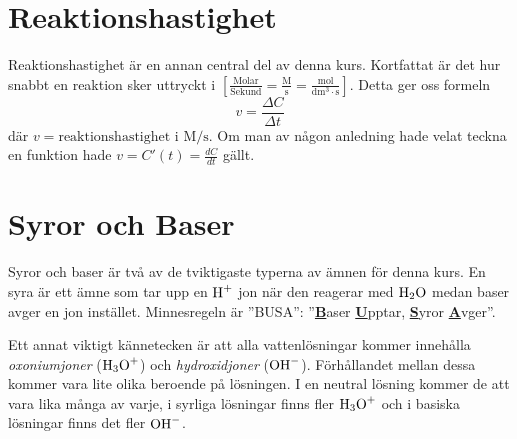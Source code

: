 \documentclass[12pt]{article}
\theoremstyle{definition}
\begin{document}
    
    \setcounter{exm}{0}
    
    \setcounter{exm}{0}

    \newpage

    \part{Reaktionshastighet}

    Reaktionshastighet är en annan central del av denna kurs. Kortfattat är det hur snabbt en reaktion sker uttryckt i $\mathrm{\left[\frac{Molar}{Sekund} = \frac{M}{s} = \frac{mol}{dm^3 \cdot s}\right]}$. Detta ger oss formeln 
    \begin{equation*}
        v = \frac{\Delta C}{\Delta t} 
    \end{equation*}
    där $v = \text{reaktionshastighet i } \mathrm{M/s}$. Om man av någon anledning hade velat teckna en funktion hade $v = C'(t) = \frac{dC}{dt}$ gällt.

    
    \setcounter{exm}{0}
    \pagebreak
    \part{Syror och Baser}

    Syror och baser är två av de tviktigaste typerna av ämnen för denna kurs. En syra är ett ämne som tar upp en $\ce{H+}$ jon när den reagerar med $\ce{H2O}$ medan baser avger en jon instället. Minnesregeln är ''BUSA'': ''\underline{\textbf{B}}aser \underline{\textbf{U}}pptar, \underline{\textbf{S}}yror \underline{\textbf{A}}vger''.

    Ett annat viktigt kännetecken är att alla vattenlösningar kommer innehålla \emph{oxoniumjoner} ($\ce{H3O+}$) och \emph{hydroxidjoner} ($\ce{OH-}$). Förhållandet mellan dessa kommer vara lite olika beroende på lösningen. I en neutral lösning kommer de att vara lika många av varje, i syrliga lösningar finns fler $\ce{H3O+}$ och i basiska lösningar finns det fler $\ce{OH-}$.

    
\end{document}
